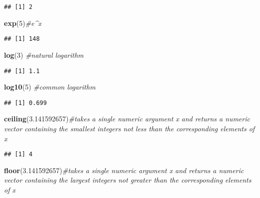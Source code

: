 \documentclass[]{book}
\newenvironment{Shaded}{\begin{snugshade}}{\end{snugshade}}
\newcommand{\KeywordTok}[1]{\textcolor[rgb]{0.13,0.29,0.53}{\textbf{#1}}}
\newcommand{\DecValTok}[1]{\textcolor[rgb]{0.00,0.00,0.81}{#1}}
\newcommand{\FloatTok}[1]{\textcolor[rgb]{0.00,0.00,0.81}{#1}}
\newcommand{\CommentTok}[1]{\textcolor[rgb]{0.56,0.35,0.01}{\textit{#1}}}
\newcommand{\NormalTok}[1]{#1}
\theoremstyle{definition}
\theoremstyle{definition}
\theoremstyle{definition}
\theoremstyle{remark}
\begin{document}
\begin{verbatim}
## [1] 2
\end{verbatim}

\begin{Shaded}
\begin{Highlighting}[]
\KeywordTok{exp}\NormalTok{(}\DecValTok{5}\NormalTok{)}\CommentTok{#e^x}
\end{Highlighting}
\end{Shaded}

\begin{verbatim}
## [1] 148
\end{verbatim}

\begin{Shaded}
\begin{Highlighting}[]
\KeywordTok{log}\NormalTok{(}\DecValTok{3}\NormalTok{)  }\CommentTok{#natural logarithm}
\end{Highlighting}
\end{Shaded}

\begin{verbatim}
## [1] 1.1
\end{verbatim}

\begin{Shaded}
\begin{Highlighting}[]
\KeywordTok{log10}\NormalTok{(}\DecValTok{5}\NormalTok{)    }\CommentTok{#common logarithm}
\end{Highlighting}
\end{Shaded}

\begin{verbatim}
## [1] 0.699
\end{verbatim}

\begin{Shaded}
\begin{Highlighting}[]
\KeywordTok{ceiling}\NormalTok{(}\FloatTok{3.141592657}\NormalTok{)}\CommentTok{#takes a single numeric argument x and returns a numeric vector containing the smallest integers not less than the corresponding elements of x}
\end{Highlighting}
\end{Shaded}

\begin{verbatim}
## [1] 4
\end{verbatim}

\begin{Shaded}
\begin{Highlighting}[]
\KeywordTok{floor}\NormalTok{(}\FloatTok{3.141592657}\NormalTok{)}\CommentTok{#takes a single numeric argument x and returns a numeric vector containing the largest integers not greater than the corresponding elements of x}
\end{Highlighting}
\end{Shaded}
\end{document}
